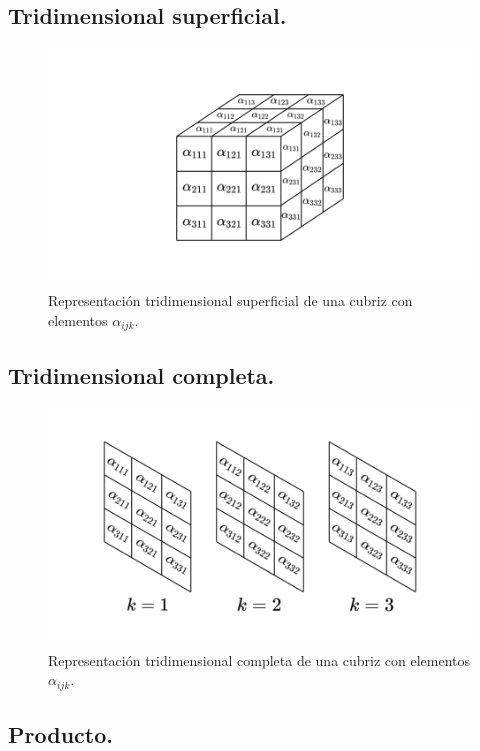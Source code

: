\documentclass[a4paper, titlepage]{article}
\begin{document}
\subsection{Tridimensional superficial.}

\begin{figure}[H]
	\includegraphics[width=\linewidth]{tridimensional_sup.png}
	\caption{Representación tridimensional superficial de una cubriz con elementos $\alpha_{ijk}$.}
\end{figure}

\subsection{Tridimensional completa.}

\begin{figure}[H]
	\includegraphics[width=\linewidth]{tridimensional_comp.png}
	\caption{Representación tridimensional completa de una cubriz con elementos $\alpha_{ijk}$.}
\end{figure}


\subsection{Producto.}
\end{document}
